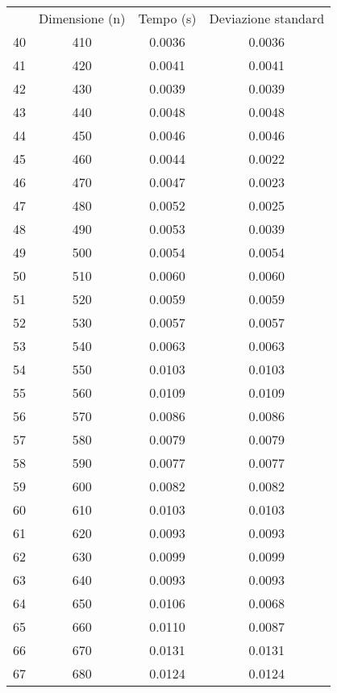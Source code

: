 \begin{table}
\centering
\begin{adjustbox}{width=1\textwidth/2}
\begin{tabular}{|c|c|c|c|}
\hline
 & Dimensione (n) & Tempo (s) & Deviazione standard \\
40 & 410 & 0.0036 & 0.0036 \\
\cline{1-4}
41 & 420 & 0.0041 & 0.0041 \\
\cline{1-4}
42 & 430 & 0.0039 & 0.0039 \\
\cline{1-4}
43 & 440 & 0.0048 & 0.0048 \\
\cline{1-4}
44 & 450 & 0.0046 & 0.0046 \\
\cline{1-4}
45 & 460 & 0.0044 & 0.0022 \\
\cline{1-4}
46 & 470 & 0.0047 & 0.0023 \\
\cline{1-4}
47 & 480 & 0.0052 & 0.0025 \\
\cline{1-4}
48 & 490 & 0.0053 & 0.0039 \\
\cline{1-4}
49 & 500 & 0.0054 & 0.0054 \\
\cline{1-4}
50 & 510 & 0.0060 & 0.0060 \\
\cline{1-4}
51 & 520 & 0.0059 & 0.0059 \\
\cline{1-4}
52 & 530 & 0.0057 & 0.0057 \\
\cline{1-4}
53 & 540 & 0.0063 & 0.0063 \\
\cline{1-4}
54 & 550 & 0.0103 & 0.0103 \\
\cline{1-4}
55 & 560 & 0.0109 & 0.0109 \\
\cline{1-4}
56 & 570 & 0.0086 & 0.0086 \\
\cline{1-4}
57 & 580 & 0.0079 & 0.0079 \\
\cline{1-4}
58 & 590 & 0.0077 & 0.0077 \\
\cline{1-4}
59 & 600 & 0.0082 & 0.0082 \\
\cline{1-4}
60 & 610 & 0.0103 & 0.0103 \\
\cline{1-4}
61 & 620 & 0.0093 & 0.0093 \\
\cline{1-4}
62 & 630 & 0.0099 & 0.0099 \\
\cline{1-4}
63 & 640 & 0.0093 & 0.0093 \\
\cline{1-4}
64 & 650 & 0.0106 & 0.0068 \\
\cline{1-4}
65 & 660 & 0.0110 & 0.0087 \\
\cline{1-4}
66 & 670 & 0.0131 & 0.0131 \\
\cline{1-4}
67 & 680 & 0.0124 & 0.0124 \\
\cline{1-4}

\end{tabular}
\end{adjustbox}
\end{table}
